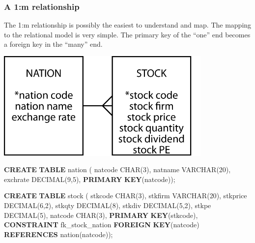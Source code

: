 \documentclass[
]{article}
\newenvironment{Shaded}{\begin{snugshade}}{\end{snugshade}}
\newcommand{\DataTypeTok}[1]{\textcolor[rgb]{0.13,0.29,0.53}{#1}}
\newcommand{\DecValTok}[1]{\textcolor[rgb]{0.00,0.00,0.81}{#1}}
\newcommand{\KeywordTok}[1]{\textcolor[rgb]{0.13,0.29,0.53}{\textbf{#1}}}
\newcommand{\NormalTok}[1]{#1}
\begin{document}
\hypertarget{a-1m-relationship}{%
\subsubsection*{A 1:m relationship}\label{a-1m-relationship}}

The 1:m relationship is possibly the easiest to understand and map. The
mapping to the relational model is very simple. The primary key of the
``one'' end becomes a foreign key in the ``many'' end.

\includegraphics[width=4.16667in,height=\textheight]{Figures/Chapter 4/nation-stock.png}

\begin{Shaded}
\begin{Highlighting}[]
\KeywordTok{CREATE} \KeywordTok{TABLE}\NormalTok{ nation (}
\NormalTok{    natcode     }\DataTypeTok{CHAR}\NormalTok{(}\DecValTok{3}\NormalTok{),}
\NormalTok{    natname     }\DataTypeTok{VARCHAR}\NormalTok{(}\DecValTok{20}\NormalTok{),}
\NormalTok{    exchrate        }\DataTypeTok{DECIMAL}\NormalTok{(}\DecValTok{9}\NormalTok{,}\DecValTok{5}\NormalTok{),}
        \KeywordTok{PRIMARY} \KeywordTok{KEY}\NormalTok{(natcode));}
\end{Highlighting}
\end{Shaded}

\begin{Shaded}
\begin{Highlighting}[]
\KeywordTok{CREATE} \KeywordTok{TABLE}\NormalTok{ stock (}
\NormalTok{    stkcode     }\DataTypeTok{CHAR}\NormalTok{(}\DecValTok{3}\NormalTok{),}
\NormalTok{    stkfirm     }\DataTypeTok{VARCHAR}\NormalTok{(}\DecValTok{20}\NormalTok{),}
\NormalTok{    stkprice        }\DataTypeTok{DECIMAL}\NormalTok{(}\DecValTok{6}\NormalTok{,}\DecValTok{2}\NormalTok{),}
\NormalTok{    stkqty      }\DataTypeTok{DECIMAL}\NormalTok{(}\DecValTok{8}\NormalTok{),}
\NormalTok{    stkdiv      }\DataTypeTok{DECIMAL}\NormalTok{(}\DecValTok{5}\NormalTok{,}\DecValTok{2}\NormalTok{),}
\NormalTok{    stkpe           }\DataTypeTok{DECIMAL}\NormalTok{(}\DecValTok{5}\NormalTok{),}
\NormalTok{    natcode     }\DataTypeTok{CHAR}\NormalTok{(}\DecValTok{3}\NormalTok{),}
        \KeywordTok{PRIMARY} \KeywordTok{KEY}\NormalTok{(stkcode),}
        \KeywordTok{CONSTRAINT}\NormalTok{ fk\_stock\_nation}
            \KeywordTok{FOREIGN} \KeywordTok{KEY}\NormalTok{(natcode) }\KeywordTok{REFERENCES}\NormalTok{ nation(natcode));}
\end{Highlighting}
\end{Shaded}
\end{document}
